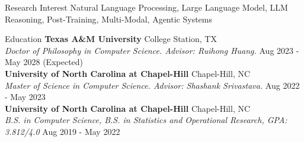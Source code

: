 \documentclass[a4paper, 12pt]{resume} %
\begin{document}
\begin{rSection}{Research Interest}
Natural Language Processing, Large Language Model, LLM Reasoning, Post-Training, Multi-Modal, Agentic Systems
\end{rSection}

\begin{rSection}{Education}
{\bf Texas A\&M University} \hfill {College Station, TX \\
{\em Doctor of Philosophy in Computer Science. Advisor: Ruihong Huang.} \hfill Aug 2023 - May 2028 (Expected)} \\
{\bf University of North Carolina at Chapel-Hill} \hfill {Chapel-Hill, NC \\
{\em Master of Science in Computer Science. Advisor: Shashank Srivastava.} \hfill Aug 2022 - May 2023} \\
{\bf University of North Carolina at Chapel-Hill} \hfill {Chapel-Hill, NC \\
{\em B.S. in Computer Science, B.S. in Statistics and Operational Research, GPA: 3.812/4.0} \hfill Aug 2019 - May 2022}

\end{rSection}
\end{document}
